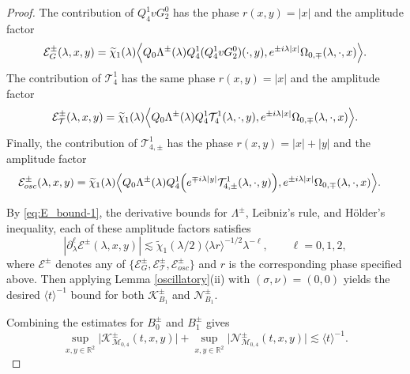 \documentclass[reqno]{amsart}
\numberwithin{equation}{section}
\begin{document}
\begin{proof}
	The contribution of $Q_4^1vG_2^0$ has the phase
	$
	r(x,y)=|x|
	$
	and the amplitude factor
	\begin{equation*}
		\mathcal{E}_{G}^\pm(\lambda,x,y)
		=
		\widetilde{\chi}_1(\lambda)
		\Bigl\langle
		Q_0\Lambda^\pm(\lambda)Q_4^1
	(Q_4^1vG_2^0)(\cdot,y),
		e^{\pm i\lambda|x|}
		\Omega_{0,\mp}(\lambda,\cdot,x)
		\Bigr\rangle.
	\end{equation*}
	The contribution of $\mathcal{T}_4^1$ has the same phase
	$r(x,y)=|x|$ and  the amplitude factor
	\begin{equation*}
		\mathcal{E}_{\mathcal{T}}^\pm(\lambda,x,y)
		=
		\widetilde{\chi}_1(\lambda)
		\Bigl\langle
		Q_0\Lambda^\pm(\lambda)Q_4^1
		\mathcal{T}_4^1(\lambda,\cdot,y),
		e^{\pm i\lambda|x|}
		\Omega_{0,\mp}(\lambda,\cdot,x)
		\Bigr\rangle.
	\end{equation*}
	Finally, the contribution of $\mathcal{T}_{4,\pm}^1$ has the  phase
	$
	r(x,y)=|x|+|y|
	$
	and the  amplitude factor
	\begin{align*}
		\mathcal{E}_{osc}^\pm(\lambda,x,y)
		={}&
		\widetilde{\chi}_1(\lambda)
		\Bigl\langle
		Q_0\Lambda^\pm(\lambda)Q_4^1
		\Bigl(
		e^{\mp i\lambda|y|}
		\mathcal{T}_{4,\pm}^1(\lambda,\cdot,y)
		\Bigr),
		e^{\pm i\lambda|x|}
		\Omega_{0,\mp}(\lambda,\cdot,x)
		\Bigr\rangle.
	\end{align*}
	
	By \eqref{eq:E_bound-1}, the derivative
	bounds for $\Lambda^\pm$, Leibniz's rule, and H\"older's inequality, each of these amplitude factors satisfies
	\begin{equation*}
		\left|
		\partial_\lambda^\ell
		\mathcal{E}^\pm(\lambda,x,y)
		\right|
		\lesssim
		\widetilde{\chi}_1(\lambda/2)
		\langle\lambda r\rangle^{-1/2}
		\lambda^{-\ell},
		\qquad
		\ell=0,1,2,
	\end{equation*}
	where $\mathcal{E}^\pm$ denotes any of
	$\{
	\mathcal{E}_{G}^\pm,
	\mathcal{E}_{\mathcal{T}}^\pm,
	\mathcal{E}_{osc}^\pm\}
	$
	and $r$ is the corresponding phase specified above. Then applying Lemma
	\ref{oscillatory}(ii) with $(\sigma,\nu)=(0,0)$ yields  the desired $\langle t\rangle^{-1}$ bound for both
	$\mathcal{K}_{B_1}^\pm$ and $\mathcal{N}_{B_1}^\pm$.
	
	Combining the estimates for $B_0^\pm$ and $B_1^\pm$ gives
	$$
	\sup_{x,y\in \mathbb{R}^2}
	\bigl|
	\mathcal{K}_{\mathcal{M}_{0,4}}^\pm(t,x,y)
	\bigr|
	+
	\sup_{x,y\in \mathbb{R}^2}
	\bigl|
	\mathcal{N}_{\mathcal{M}_{0,4}}^\pm(t,x,y)
	\bigr|
	\lesssim
	\langle t\rangle^{-1}.
	$$


\end{proof}
\end{document}
